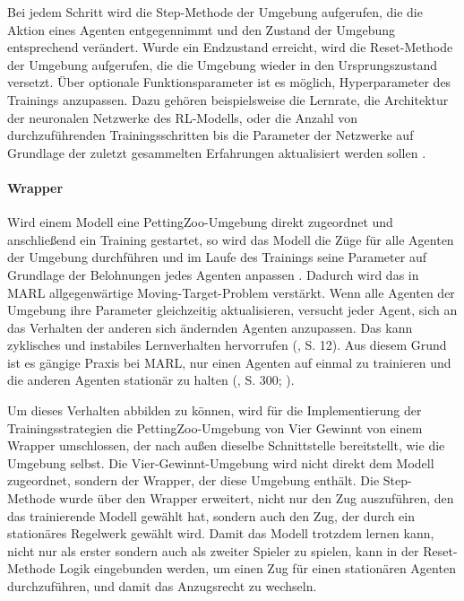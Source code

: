 Bei jedem Schritt wird die Step-Methode der Umgebung aufgerufen, die die Aktion eines Agenten entgegennimmt und den Zustand der Umgebung entsprechend verändert. Wurde ein Endzustand erreicht, wird die Reset-Methode der Umgebung aufgerufen, die die Umgebung wieder in den Ursprungszustand versetzt. Über optionale Funktionsparameter ist es möglich, Hyperparameter des Trainings anzupassen. Dazu gehören beispielsweise die Lernrate, die Architektur der neuronalen Netzwerke des RL-Modells, oder die Anzahl von durchzuführenden Trainingsschritten bis die Parameter der Netzwerke auf Grundlage der zuletzt gesammelten Erfahrungen aktualisiert werden sollen \cite{Raffin.2021}.

\paragraph{Wrapper}

\label{wrapper}

Wird einem Modell eine PettingZoo-Umgebung direkt zugeordnet und anschließend ein Training gestartet, so wird das Modell die Züge für alle Agenten der Umgebung durchführen und im Laufe des Trainings seine Parameter auf Grundlage der Belohnungen jedes Agenten anpassen \cite{Farama.2025}. Dadurch wird das in MARL allgegenwärtige Moving-Target-Problem verstärkt. Wenn alle Agenten der Umgebung ihre Parameter gleichzeitig aktualisieren, versucht jeder Agent, sich an das Verhalten der anderen sich ändernden Agenten anzupassen. Das kann zyklisches und instabiles Lernverhalten hervorrufen (\cite{Albrecht.2024}, S. 12). Aus diesem Grund ist es gängige Praxis bei MARL, nur einen Agenten auf einmal zu trainieren und die anderen Agenten stationär zu halten (\cite{Albrecht.2024}, S. 300; \cite{Zhong.2020}).

Um dieses Verhalten abbilden zu können, wird für die Implementierung der Trainingsstrategien die PettingZoo-Umgebung von Vier Gewinnt von einem Wrapper umschlossen, der nach außen dieselbe Schnittstelle bereitstellt, wie die Umgebung selbst. Die Vier-Gewinnt-Umgebung wird nicht direkt dem Modell zugeordnet, sondern der Wrapper, der diese Umgebung enthält. Die Step-Methode wurde über den Wrapper erweitert, nicht nur den Zug auszuführen, den das trainierende Modell gewählt hat, sondern auch den Zug, der durch ein stationäres Regelwerk gewählt wird. Damit das Modell trotzdem lernen kann, nicht nur als erster sondern auch als zweiter Spieler zu spielen, kann in der Reset-Methode Logik eingebunden werden, um einen Zug für einen stationären Agenten durchzuführen, und damit das Anzugsrecht zu wechseln.

